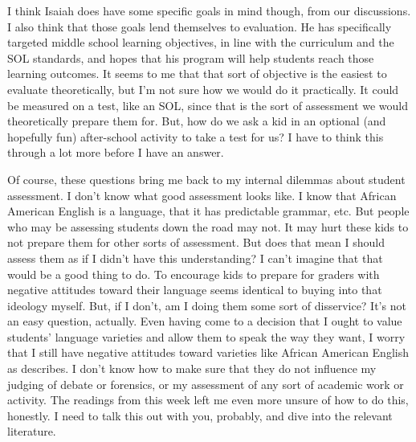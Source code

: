 \documentclass[man,12pt]{apa6}
\begin{document}
I think Isaiah does have some specific goals in mind though, from our
discussions. I also think that those goals lend themselves to evaluation.  He
has specifically targeted middle school learning objectives, in line with the
curriculum and the SOL standards, and hopes that his program will help students
reach those learning outcomes. 
It seems to me that that sort of objective is the easiest to evaluate
theoretically, but I'm not sure how we would do it practically. It could be
measured on a test, like an SOL, since that is the sort of assessment we would
theoretically prepare them for. But, how do we ask a kid in an optional (and
hopefully fun) after-school activity to take a test for us? 
I have to think this through a lot more before I have an answer.

Of course, these questions bring me back to my internal dilemmas about student
assessment. I don't know what good assessment looks like. I know that African
American English is a language, that it has predictable grammar, etc. But
people who may be assessing students down the road may not. It may hurt these
kids to not prepare them for other sorts of assessment. 
But does that mean I should assess them as if I didn't have this understanding?
I can't imagine that that would be a good thing to do.  To encourage kids to
prepare for graders with negative attitudes toward their language seems
identical to buying into that ideology myself. But, if I don't, am I doing them
some sort of disservice? It's not an easy question, actually. 
Even having come to a decision that I ought to value students' language
varieties and allow them to speak the way they want, I worry that I still have
negative attitudes toward varieties like African American English as
 describes. I don't know how to make sure that they do not
influence my judging of debate or forensics, or my assessment of any sort of
academic work or activity. The readings from this week left me even more unsure
of how to do this, honestly. I need to talk this out with you, probably, and
dive into the relevant literature. 

\nocite{CharityHudley10}

\clearpage



\end{document}
